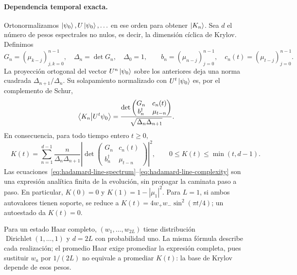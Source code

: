 \paragraph{Dependencia temporal exacta.}
Ortonormalizamos $\ket{\psi_0},U\ket{\psi_0},\ldots$ en ese orden para
obtener $\ket{K_n}$. Sea $d$ el número de pesos espectrales no nulos,
es decir, la dimensión cíclica de Krylov. Definimos
\begin{equation}
 G_n=(\mu_{k-j})_{j,k=0}^{n-1},\quad
 \Delta_n=\det G_n,\quad\Delta_0=1,\qquad
 b_n=(\mu_{n-j})_{j=0}^{n-1},\quad
 c_n(t)=(\mu_{t-j})_{j=0}^{n-1}.
 \label{eq:hadamard-line-gram}
\end{equation}
La proyección ortogonal del vector $U^n\ket{\psi_0}$ sobre los anteriores
deja una norma cuadrada $\Delta_{n+1}/\Delta_n$.
Su solapamiento normalizado con $U^t\ket{\psi_0}$ es, por el complemento
de Schur,
\begin{equation}
 \braket{K_n}{U^t\psi_0}
 =\frac{\displaystyle\det
   \begin{pmatrix}G_n&c_n(t)\\b_n^\dagger&\mu_{t-n}\end{pmatrix}}
  {\sqrt{\Delta_n\Delta_{n+1}}}.
 \label{eq:hadamard-line-amplitude}
\end{equation}
En consecuencia, para todo tiempo entero $t\geq0$,
\begin{equation}
 \boxed{\quad
 K(t)=\sum_{n=1}^{d-1}\frac{n}{\Delta_n\Delta_{n+1}}
 \left|\det\begin{pmatrix}
 G_n&c_n(t)\\ b_n^\dagger&\mu_{t-n}
 \end{pmatrix}\right|^2,\qquad
 0\leq K(t)\leq\min(t,d-1).
 \quad}
 \label{eq:hadamard-line-complexity}
\end{equation}
Las ecuaciones~\eqref{eq:hadamard-line-spectrum}--\eqref{eq:hadamard-line-complexity}
son una expresión analítica finita de la evolución, sin propagar la
caminata paso a paso. En particular, $K(0)=0$ y
$K(1)=1-|\mu_1|^2$. Para $L=1$, si ambos autovalores tienen soporte,
se reduce a $K(t)=4w_+w_-\sin^2(\pi t/4)$; un autoestado da $K(t)=0$.

Para un estado Haar completo, $(w_1,\ldots,w_{2L})$ tiene distribución
$\operatorname{Dirichlet}(1,\ldots,1)$ y $d=2L$ con probabilidad uno.
La misma fórmula describe cada realización; el promedio Haar exige
promediar la expresión completa, pues sustituir $w_a$ por $1/(2L)$
no equivale a promediar $K(t)$: la base de Krylov depende de esos pesos.


